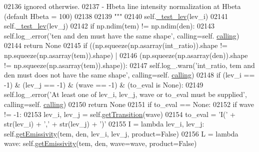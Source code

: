 \begin{DoxyCode}
02136 \textcolor{stringliteral}{                            ignored otherwise.}
02137 \textcolor{stringliteral}{            - Hbeta        line intensity normalization at Hbeta (default Hbeta = 100)}
02138 \textcolor{stringliteral}{        }
02139 \textcolor{stringliteral}{        """}
02140         self.\hyperlink{classpyneb_1_1core_1_1pynebcore_1_1_atom_ade3de73e8bdb814d01d2d9af98eba87f}{\_test\_lev}(lev\_i)
02141         self.\hyperlink{classpyneb_1_1core_1_1pynebcore_1_1_atom_ade3de73e8bdb814d01d2d9af98eba87f}{\_test\_lev}(lev\_j)
02142         \textcolor{keywordflow}{if} np.ndim(tem) != np.ndim(den):
02143             self.log\_.error(\textcolor{stringliteral}{'ten and den must have the same shape'}, calling=self.
      \hyperlink{classpyneb_1_1core_1_1pynebcore_1_1_atom_a373b7735acf4f528b54bddf373ad67a1}{calling})
02144             \textcolor{keywordflow}{return} \textcolor{keywordtype}{None}
02145         \textcolor{keywordflow}{if} ((np.squeeze(np.asarray(int\_ratio)).shape != np.squeeze(np.asarray(tem)).shape) | 
02146             (np.squeeze(np.asarray(den)).shape != np.squeeze(np.asarray(tem)).shape)):
02147             self.log\_.warn(\textcolor{stringliteral}{'int\_ratio, tem and den must does not have the same shape'}, calling=self.
      \hyperlink{classpyneb_1_1core_1_1pynebcore_1_1_atom_a373b7735acf4f528b54bddf373ad67a1}{calling})
02148         \textcolor{keywordflow}{if} (lev\_i == -1) & (lev\_j == -1) & (wave == -1) & (to\_eval \textcolor{keywordflow}{is} \textcolor{keywordtype}{None}):
02149             self.log\_.error(\textcolor{stringliteral}{'At least one of lev\_i, lev\_j, wave or to\_eval must be supplied'}, calling=self.
      \hyperlink{classpyneb_1_1core_1_1pynebcore_1_1_atom_a373b7735acf4f528b54bddf373ad67a1}{calling})
02150             \textcolor{keywordflow}{return} \textcolor{keywordtype}{None}
02151         \textcolor{keywordflow}{if} to\_eval == \textcolor{keywordtype}{None}:
02152             \textcolor{keywordflow}{if} wave != -1:
02153                 lev\_i, lev\_j = self.\hyperlink{classpyneb_1_1core_1_1pynebcore_1_1_atom_a7c9f17a3d9e841267add92377d9d1ede}{getTransition}(wave)     
02154             to\_eval = \textcolor{stringliteral}{'I('} + str(lev\_i) + \textcolor{stringliteral}{','} + str(lev\_j) + \textcolor{stringliteral}{')'} 
02155         I = \textcolor{keyword}{lambda} lev\_i, lev\_j: self.\hyperlink{classpyneb_1_1core_1_1pynebcore_1_1_atom_aaf4e84a9d5f835e6284bd9302314f775}{getEmissivity}(tem, den, lev\_i, lev\_j, product=\textcolor{keyword}{False})
02156         L = \textcolor{keyword}{lambda} wave: self.\hyperlink{classpyneb_1_1core_1_1pynebcore_1_1_atom_aaf4e84a9d5f835e6284bd9302314f775}{getEmissivity}(tem, den, wave=wave, product=\textcolor{keyword}{False})

\end{DoxyCode}
